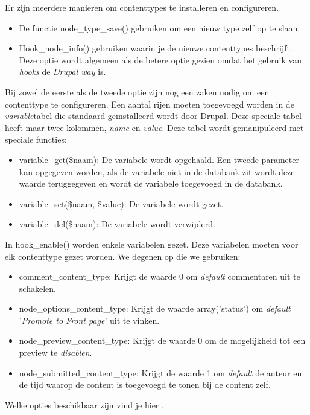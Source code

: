 \noindent
Er zijn meerdere manieren om contenttypes te installeren en configureren.
\begin{itemize}
\item De functie node\_type\_save() gebruiken om een nieuw type zelf op te slaan.
\item Hook\_node\_info() gebruiken waarin je de nieuwe contenttypes beschrijft. Deze optie wordt algemeen als de betere optie gezien omdat het gebruik van \textit{hooks} de\textit{ Drupal way} is.
\end{itemize}
Bij zowel de eerste als de tweede optie zijn nog een zaken nodig om een contenttype te configureren. Een aantal rijen moeten toegevoegd worden in de \textit{variable}tabel die standaard ge\"{i}nstalleerd wordt door Drupal. Deze speciale tabel heeft maar twee kolommen, \textit{name} en \textit{value}. Deze tabel wordt gemanipuleerd met speciale functies:
\begin{itemize}
\item variable\_get(\$naam): De variabele wordt opgehaald. Een tweede parameter kan opgegeven worden, als de variabele niet in de databank zit wordt deze waarde teruggegeven en wordt de variabele toegevoegd in de databank.
\item variable\_set(\$naam, \$value): De variabele wordt gezet.
\item variable\_del(\$naam): De variabele wordt verwijderd.
\end{itemize}

\noindent
In hook\_enable() worden enkele variabelen gezet. Deze variabelen moeten voor elk contenttype gezet worden. We degenen op die we gebruiken:
\begin{itemize}
\item comment\_content\_type: Krijgt de waarde 0 om \textit{default} commentaren uit te schakelen.
\item node\_options\_content\_type: Krijgt de waarde array('status') om \textit{default} '\textit{Promote to Front page}' uit te vinken.
\item node\_preview\_content\_type: Krijgt de waarde 0 om de mogelijkheid tot een preview te \textit{disablen}.
\item node\_submitted\_content\_type: Krijgt de waarde 1 om \textit{default} de auteur en de tijd waarop de content is toegevoegd te tonen bij de content zelf.
\end{itemize}
Welke opties beschikbaar zijn vind je hier \cite{contentTypeVariables}.\\

